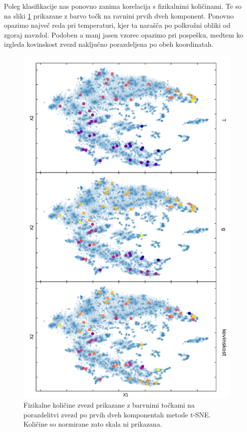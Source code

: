 \documentclass[11pt,a4paper]{article}
\begin{document}
\clearpage

Poleg klasifikacije nas ponovno zanima korelacija s fizikalnimi količinami. Te so na sliki \ref{9} prikazane z barvo točk na ravnini prvih dveh komponent. Ponovno opazimo največ reda pri temperaturi, kjer ta narašča po polkrožni obliki od zgoraj navzdol. Podoben a manj jasen vzorec opazimo pri pospešku, medtem ko izgleda kovinskost zvezd naključno porazdeljena po obeh koordinatah.

\begin{figure}[h]
    \centering
    \hbox{\hspace{10em}\includegraphics[scale=0.6]{tSNE_corr}}
    \caption{Fizikalne količine zvezd prikazane z barvnimi točkami na porazdelitvi zvezd po prvih dveh komponentah metode t-SNE. Količine so normirane zato skala ni prikazana.}
    \label{9}
\end{figure}
\end{document}
